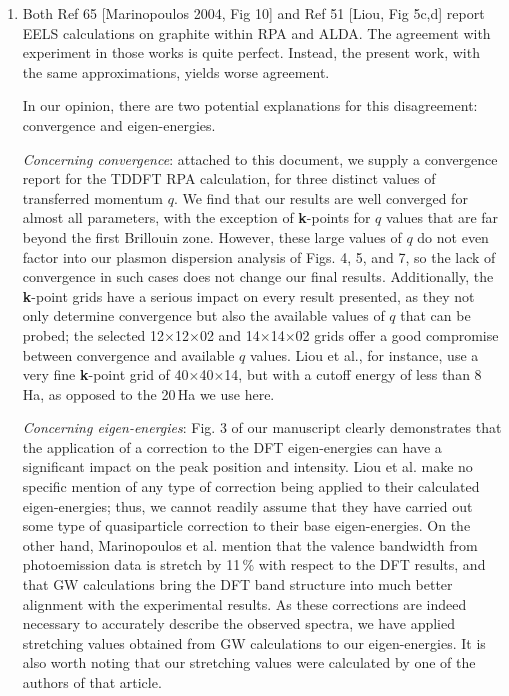 \documentclass[aps,prb,10pt,endfloats]{revtex4-1}
\begin{document}
\begin{enumerate}

\item
Both Ref 65 [Marinopoulos 2004, Fig 10] and Ref 51 [Liou, Fig 5c,d] report EELS
calculations on graphite within RPA and ALDA. The agreement with experiment in
those works is quite perfect. Instead, the present work, with the same
approximations, yields worse agreement.
\begin{shaded*}
In our opinion, there are two potential explanations for this disagreement:
convergence and eigen-energies.

\emph{Concerning convergence}: attached to this document, we supply a
convergence report for the TDDFT RPA calculation, for three distinct values of
transferred momentum $q$. We find that our results are well converged for almost
all parameters, with the exception of \textbf{k}-points for $q$ values that are
far beyond the first Brillouin zone. However, these large values of $q$ do not
even factor into our plasmon dispersion analysis of Figs. 4, 5, and 7, so the
lack of convergence in such cases does not change our final results.
Additionally, the \textbf{k}-point grids have a serious impact on every result
presented, as they not only determine convergence but also the available values
of $q$ that can be probed; the selected 12$\times$12$\times$02 and
14$\times$14$\times$02 grids offer a good compromise between convergence and
available $q$ values. Liou et al., for instance, use a very fine
\textbf{k}-point grid of 40$\times$40$\times$14, but with a cutoff energy of
less than 8\,Ha, as opposed to the 20\,Ha we use here.

\emph{Concerning eigen-energies}: Fig. 3 of our manuscript clearly demonstrates
that the application of a correction to the DFT eigen-energies can have a
significant impact on the peak position and intensity. Liou et al. make no
specific mention of any type of correction being applied to their calculated
eigen-energies; thus, we cannot readily assume that they have carried out some
type of quasiparticle correction to their base eigen-energies. On the other
hand, Marinopoulos et al. mention that the valence bandwidth from photoemission
data is stretch by 11\,\% with respect to the DFT results, and that GW
calculations bring the DFT band structure into much better alignment with the
experimental results. As these corrections are indeed necessary to accurately
describe the observed spectra, we have applied stretching values obtained from
GW calculations to our eigen-energies. It is also worth noting that our
stretching values were calculated by one of the authors of that article.


\end{shaded*}
\end{enumerate}
\end{document}
